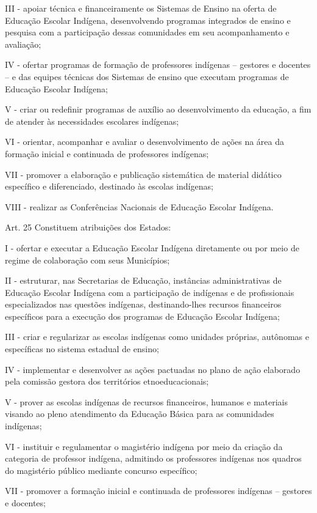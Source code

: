 \documentclass[
]{book}
\begin{document}
III - apoiar técnica e financeiramente os Sistemas de Ensino na oferta de Educação Escolar Indígena, desenvolvendo programas integrados de ensino e pesquisa com a participação dessas comunidades em seu acompanhamento e avaliação;

IV - ofertar programas de formação de professores indígenas -- gestores e docentes -- e das equipes técnicas dos Sistemas de ensino que executam programas de Educação Escolar Indígena;

V - criar ou redefinir programas de auxílio ao desenvolvimento da educação, a fim de atender às necessidades escolares indígenas;

VI - orientar, acompanhar e avaliar o desenvolvimento de ações na área da formação inicial e continuada de professores indígenas;

VII - promover a elaboração e publicação sistemática de material didático específico e diferenciado, destinado às escolas indígenas;

VIII - realizar as Conferências Nacionais de Educação Escolar Indígena.

Art. 25 Constituem atribuições dos Estados:

I - ofertar e executar a Educação Escolar Indígena diretamente ou por meio de regime de colaboração com seus Municípios;

II - estruturar, nas Secretarias de Educação, instâncias administrativas de Educação Escolar Indígena com a participação de indígenas e de profissionais especializados nas questões indígenas, destinando-lhes recursos financeiros específicos para a execução dos programas de Educação Escolar Indígena;

III - criar e regularizar as escolas indígenas como unidades próprias, autônomas e específicas no sistema estadual de ensino;

IV - implementar e desenvolver as ações pactuadas no plano de ação elaborado pela comissão gestora dos territórios etnoeducacionais;

V - prover as escolas indígenas de recursos financeiros, humanos e materiais visando ao pleno atendimento da Educação Básica para as comunidades indígenas;

VI - instituir e regulamentar o magistério indígena por meio da criação da categoria de professor indígena, admitindo os professores indígenas nos quadros do magistério público mediante concurso específico;

VII - promover a formação inicial e continuada de professores indígenas -- gestores e docentes;
\end{document}
